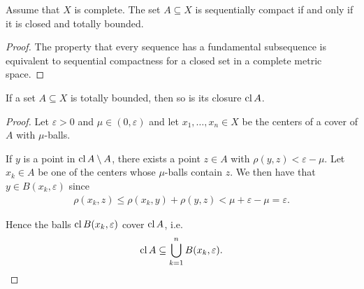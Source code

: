 \begin{corollary}\label{thm:metric_compact_iff_closed_totally_bounded}
  Assume that $X$ is complete. The set $A \subseteq X$ is sequentially compact if and only if it is closed and totally bounded.
\end{corollary}
\begin{proof}
  The property that every sequence has a fundamental subsequence is equivalent to sequential compactness for a closed set in a complete metric space.
\end{proof}

\begin{proposition}\label{thm:closure_of_totally_bounded_is_totally_bounded}
  If a set $A \subseteq X$ is totally bounded, then so is its closure $\operatorname{cl} A$.
\end{proposition}
\begin{proof}
  Let $\varepsilon > 0$ and $\mu \in (0, \varepsilon)$ and let $x_1, \ldots, x_n \in X$ be the centers of a cover of $A$ with $\mu$-balls.

  If $y$ is a point in $\operatorname{cl} A \setminus A$, there exists a point $z \in A$ with $\rho(y, z) < \varepsilon - \mu$. Let $x_k \in A$ be one of the centers whose $\mu$-balls contain $z$. We then have that $y \in B(x_k, \varepsilon)$ since
  \begin{align*}
    \rho(x_k, z) \leq \rho(x_k, y) + \rho(y, z) < \mu + \varepsilon - \mu = \varepsilon.
  \end{align*}

  Hence the balls $\operatorname{cl} B(x_k, \varepsilon)$ cover $\operatorname{cl} A$, i.e.
  \begin{align*}
    \operatorname{cl} A \subseteq \bigcup_{k=1}^n B(x_k, \varepsilon).
  \end{align*}
\end{proof}

